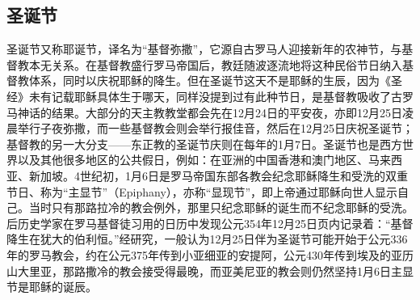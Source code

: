 \subsection{圣诞节}

圣诞节又称耶诞节，译名为“基督弥撒”，它源自古罗马人迎接新年的农神节，与基督教本无关系。在基督教盛行罗马帝国后，教廷随波逐流地将这种民俗节日纳入基督教体系，同时以庆祝耶稣的降生。但在圣诞节这天不是耶稣的生辰，因为《圣经》未有记载耶稣具体生于哪天，同样没提到过有此种节日，是基督教吸收了古罗马神话的结果。大部分的天主教教堂都会先在12月24日的平安夜，亦即12月25日凌晨举行子夜弥撒，而一些基督教会则会举行报佳音，然后在12月25日庆祝圣诞节；基督教的另一大分支——东正教的圣诞节庆则在每年的1月7日。圣诞节也是西方世界以及其他很多地区的公共假日，例如：在亚洲的中国香港和澳门地区、马来西亚、新加坡。4世纪初，1月6日是罗马帝国东部各教会纪念耶稣降生和受洗的双重节日、称为“主显节”（Epiphany），亦称“显现节”，即上帝通过耶稣向世人显示自己。当时只有那路拉冷的教会例外，那里只纪念耶稣的诞生而不纪念耶稣的受洗。后历史学家在罗马基督徒习用的日历中发现公元354年12月25日页内记录着：“基督降生在犹大的伯利恒。”经研究，一般认为12月25日伴为圣诞节可能开始于公元336年的罗马教会，约在公元375年传到小亚细亚的安提阿，公元430年传到埃及的亚历山大里亚，那路撒冷的教会接受得最晚，而亚美尼亚的教会则仍然坚持1月6日主显节是耶稣的诞辰。

